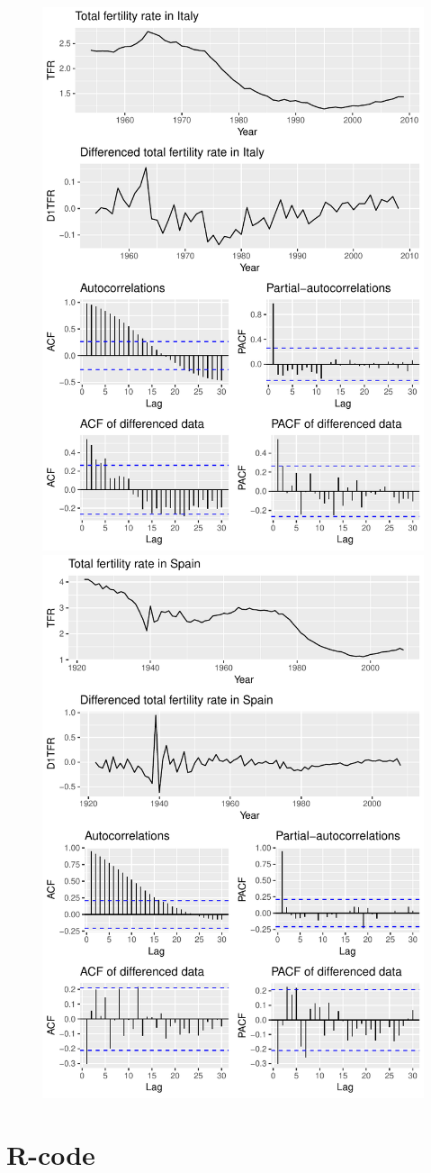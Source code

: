 \documentclass[a4paper, 12pt]{scrartcl}
\begin{document}
\begin{figure}[h!]
	\centering
	\includegraphics[height=0.85\textwidth, angle=-90]{ACItaly}
	\includegraphics[height=0.85\textwidth, angle=-90]{ACSpain}
\end{figure}
\FloatBarrier
\newpage
\section{R-code}
\end{document}
